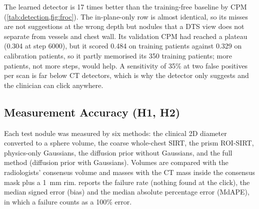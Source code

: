 The learned detector is 17 times better than the training-free baseline by CPM (\cref{tab:detection,fig:froc}). The in-plane-only row is almost identical, so its misses are not suggestions at the wrong depth but nodules that a DTS view does not separate from vessels and chest wall. Its validation CPM had reached a plateau (0.304 at step \num{6000}), but it scored 0.484 on training patients against 0.329 on calibration patients, so it partly memorised its 350 training patients; more patients, not more steps, would help. A sensitivity of 35\% at two false positives per scan is far below CT detectors, which is why the detector only suggests and the clinician can click anywhere.


\subsection{Measurement Accuracy (H1, H2)}

Each test nodule was measured by six methods: the clinical 2D diameter converted to a sphere volume, the coarse whole-chest SIRT, the prism ROI-SIRT, physics-only Gaussians, the diffusion prior without Gaussians, and the full method (diffusion prior with Gaussians). Volumes are compared with the radiologists' consensus volume and masses with the CT mass inside the consensus mask plus a 1~mm rim.  reports the failure rate (nothing found at the click), the median signed error (bias) and the median absolute percentage error (MdAPE), in which a failure counts as a 100\% error.

